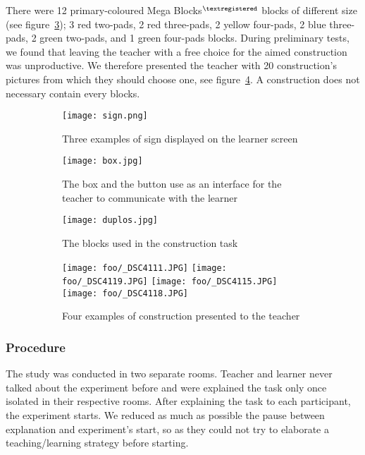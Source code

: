 There were 12 primary-coloured Mega Blocks$^{\textregistered}$ blocks of different size (see figure~\ref{fig:duplos}); 3 red two-pads, 2 red three-pads, 2 yellow four-pads, 2 blue three-pads, 2 green two-pads, and 1 green four-pads blocks. During preliminary tests, we found that leaving the teacher with a free choice for the aimed construction was unproductive. We therefore presented the teacher with 20 construction's pictures from which they should choose one, see figure~\ref{fig:constructions}. A construction does not necessary contain every blocks.

\begin{figure}[H]	
	\centering
	\begin{subfigure}[t]{0.32\columnwidth}
		\centering
		\texttt{[image: sign.png]}
		\caption{Three examples of sign displayed on the learner screen}\label{fig:sign}		
	\end{subfigure}
	\begin{subfigure}[t]{0.32\columnwidth}
		\centering
		\texttt{[image: box.jpg]}
		\caption{The box and the button use as an interface for the teacher to communicate with the learner}\label{fig:box}
	\end{subfigure}
	\begin{subfigure}[t]{0.32\columnwidth}
		\centering
		\texttt{[image: duplos.jpg]}
		\caption{The blocks used in the construction task}\label{fig:duplos}
	\end{subfigure}
	\begin{subfigure}[b]{\columnwidth}
		\centering
		\texttt{[image: foo/\_DSC4111.JPG]}
		\texttt{[image: foo/\_DSC4119.JPG]}
		\texttt{[image: foo/\_DSC4115.JPG]}
		\texttt{[image: foo/\_DSC4118.JPG]}
		\caption{Four examples of construction presented to the teacher}\label{fig:constructions}
    \end{subfigure}
    \caption{}\label{fig:setup}
\end{figure}

\subsubsection{Procedure}

The study was conducted in two separate rooms. Teacher and learner never talked about the experiment before and were explained the task only once isolated in their respective rooms. After explaining the task to each participant, the experiment starts. We reduced as much as possible the pause between explanation and experiment's start, so as they could not try to elaborate a teaching/learning strategy before starting. 


